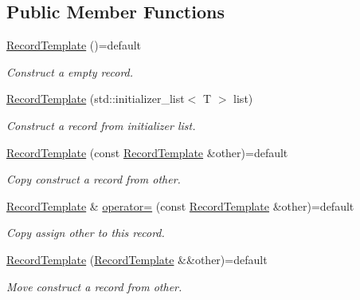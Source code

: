 \subsection*{Public Member Functions}
\begin{DoxyCompactItemize}
\item 
\hyperlink{class_mdt_1_1_plain_text_1_1_record_template_a41d66a5fcd2b428f6069df48ae62f1b9}{Record\+Template} ()=default
\begin{DoxyCompactList}\small\item\em Construct a empty record. \end{DoxyCompactList}\item 
\hyperlink{class_mdt_1_1_plain_text_1_1_record_template_a26a12294fd3e952dc03c25deb52ad604}{Record\+Template} (std\+::initializer\+\_\+list$<$ T $>$ list)
\begin{DoxyCompactList}\small\item\em Construct a record from initializer list. \end{DoxyCompactList}\item 
\hyperlink{class_mdt_1_1_plain_text_1_1_record_template_a6a8b445abddb7a6d3788f6ac46af727b}{Record\+Template} (const \hyperlink{class_mdt_1_1_plain_text_1_1_record_template}{Record\+Template} \&other)=default
\begin{DoxyCompactList}\small\item\em Copy construct a record from {\itshape other}. \end{DoxyCompactList}\item 
\hyperlink{class_mdt_1_1_plain_text_1_1_record_template}{Record\+Template} \& \hyperlink{class_mdt_1_1_plain_text_1_1_record_template_a0d02bf23beda040d619bb97eb77e2662}{operator=} (const \hyperlink{class_mdt_1_1_plain_text_1_1_record_template}{Record\+Template} \&other)=default
\begin{DoxyCompactList}\small\item\em Copy assign {\itshape other} to this record. \end{DoxyCompactList}\item 
\hyperlink{class_mdt_1_1_plain_text_1_1_record_template_a25b068cf7af66b9e0849d7048bd89bfe}{Record\+Template} (\hyperlink{class_mdt_1_1_plain_text_1_1_record_template}{Record\+Template} \&\&other)=default
\begin{DoxyCompactList}\small\item\em Move construct a record from {\itshape other}. \end{DoxyCompactList}\item 

\end{DoxyCompactItemize}
